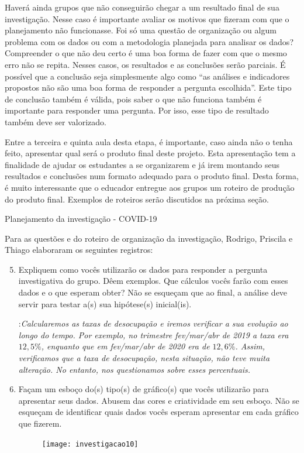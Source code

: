 \begin{texto}
{Haverá ainda grupos que não conseguirão chegar a um resultado final de sua investigação. Nesse caso é importante avaliar os motivos que fizeram com que o planejamento não funcionasse. Foi só uma questão de organização ou algum problema com os dados ou com a metodologia planejada para analisar os dados? Compreender o que não deu certo é uma boa forma de fazer com que o mesmo erro não se repita. Nesses casos, os resultados e as conclusões serão parciais. É possível que a conclusão seja simplesmente algo como “as análises e indicadores propostos não são uma boa forma de responder a pergunta escolhida”. Este tipo de conclusão também é válida, pois saber o que não funciona também é importante para responder uma pergunta. Por isso, esse tipo de resultado também deve ser valorizado.

Entre a terceira e quinta aula desta etapa, é importante, caso ainda não o tenha feito, apresentar  qual será o produto final deste projeto. Esta apresentação tem a finalidade de ajudar os estudantes a se organizarem e já irem montando seus resultados e conclusões num formato adequado para o produto final. Desta forma, é muito interessante que o educador entregue aos grupos um roteiro de produção do produto final. Exemplos de roteiros serão discutidos na próxima seção.

}
\end{texto}
\begin{example}{Planejamento da investigação - COVID-19}

Para as questões  e  do roteiro de organização da investigação, Rodrigo, Priscila e Thiago elaboraram os seguintes registros:

\begin{enumerate}[label=\titem{\arabic*)}]\setcounter{enumi}{4}
\item Expliquem como vocês utilizarão os dados para responder a pergunta investigativa do grupo. Dêem exemplos. Que cálculos vocês farão com esses dados e o que esperam obter? Não se esqueçam que ao final, a análise deve servir para testar a(s) sua hipótese(s) inicial(is).

:\textit{Calcularemos as taxas de desocupação e iremos verificar a sua evolução ao longo do tempo. Por exemplo, no trimestre fev/mar/abr de 2019 a taxa era $12,5\%$, enquanto que em fev/mar/abr de 2020 era de $12,6\%$.  Assim, verificamos que a taxa de desocupação, nesta situação, não teve muita alteração. No entanto, nos questionamos sobre esses percentuais.}

\item Façam um esboço do(s) tipo(s) de gráfico(s) que vocês utilizarão para apresentar seus dados. Abusem das cores e criatividade em seu esboço. Não se esqueçam de identificar quais dados vocês esperam apresentar em cada gráfico que fizerem.

\begin{figure}[H]
\centering

\texttt{[image: investigacao10]}
\end{figure}

\end{enumerate}

\end{example}


